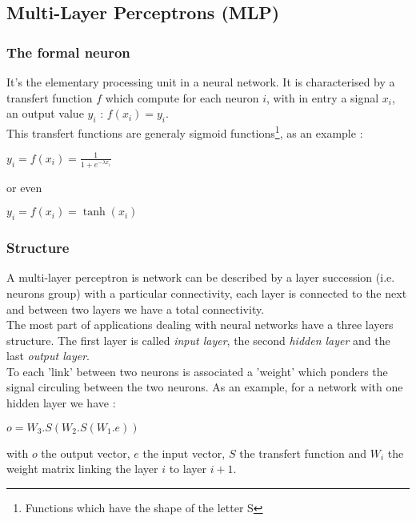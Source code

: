 \subsection{Multi-Layer Perceptrons (MLP)}

\subsubsection{The formal neuron}

It's the elementary processing unit in a neural network. It is characterised by a 
transfert function $f$ which compute for each neuron $i$, with in entry a signal $x_i$,
an output value $y_{i}$ : $f(x_{i})=y_{i}$.\\
This transfert functions are generaly sigmoid functions\footnote{Functions which have the
shape of the letter S}, as an example :

\begin{center}
 $y_{i}=f(x_{i})=\frac{1}{1+e^{-\lambda x_{i}}}$
\end{center}

or even

\begin{center}
 $y_{i}=f(x_{i})=\tanh (x_{i})$
\end{center}

\subsubsection{Structure}

A multi-layer perceptron is network can be described by a layer succession (i.e. 
neurons group) with a particular connectivity, each layer is connected to the
next and between two layers we have a total connectivity.\\
The most part of applications dealing with neural networks have a three layers 
structure. The first layer is called \emph{input layer}, the second \emph{hidden layer} and
the last \emph{output layer}.\\
To each 'link' between two neurons is associated a 'weight' which ponders the signal 
circuling between the two neurons. As an example, for a network with one hidden layer we have :

\begin{center}
 $o=W_{3}.S(W_{2}.S(W_{1}.e))$
\end{center}

with $o$ the output vector, $e$ the input vector, $S$ the transfert function and $W_i$ the
weight matrix linking the layer $i$ to layer $i+1$.


